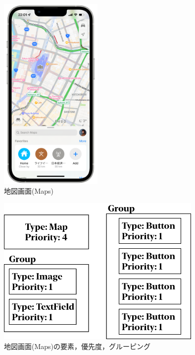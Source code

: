 \begin{figure}[htbp]
  \begin{minipage}{\hsize}
    \begin{center}
       \includegraphics[width=50mm]{img/Maps_screenshot.png}
    \end{center}
    \caption{地図画面(Maps)}
    \label{fig:Maps_screenshot}
  \end{minipage}
\end{figure}

\begin{figure}[htbp]
  \begin{minipage}{\hsize}
    \begin{center}
       \includegraphics[width=100mm]{img/Maps_ViewStructure.png}
    \end{center}
    \caption{地図画面(Maps)の要素，優先度，グルーピング}
    \label{fig:Maps_ViewStructure}
  \end{minipage}
\end{figure}

